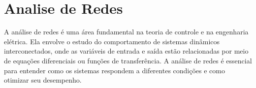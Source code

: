 
\chapter{Analise de Redes}
\label{chap: analise de Redes}

A análise de redes é uma área fundamental na teoria de controle e na engenharia elétrica. Ela envolve o estudo do comportamento de sistemas dinâmicos interconectados, onde as variáveis de entrada e saída estão relacionadas por meio de equações diferenciais ou funções de transferência. A análise de redes é essencial para entender como os sistemas respondem a diferentes condições e como otimizar seu desempenho.

